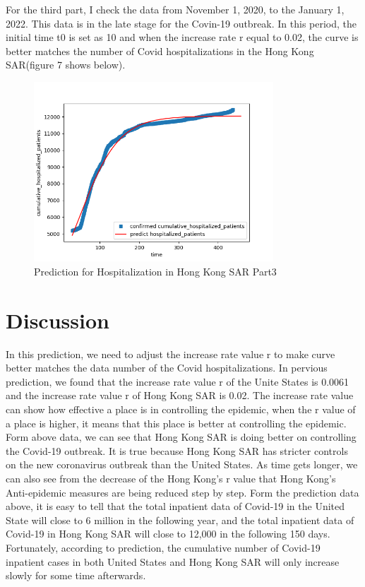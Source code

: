 \documentclass[12pt]{article}
\begin{document}
	For the third part, I check the data from November 1, 2020, to the January 1, 2022. This data is in the late stage for the Covin-19 outbreak. In this period, the initial time t0 is set as 10 and when the increase rate r equal to 0.02, the curve is better matches the number of Covid hospitalizations in the Hong Kong SAR(figure 7 shows below).
	\clearpage
	\begin{figure}[h]
		\centering
		\includegraphics[width=0.8\textwidth]{Figure7.png}
		\caption{Prediction for Hospitalization in Hong Kong SAR Part3}
	\end{figure}
	
	\section{Discussion}
	
	In this prediction, we need to adjust the increase rate value r to make curve better matches the data number of the Covid hospitalizations. In pervious prediction, we found that the increase rate value r of the Unite States is 0.0061 and the increase rate value r of Hong Kong SAR is 0.02. The increase rate value can show how effective a place is in controlling the epidemic, when the r value of a place is higher, it means that this place is better at controlling the epidemic. Form above data, we can see that Hong Kong SAR is doing better on controlling the Covid-19 outbreak. It is true because Hong Kong SAR has stricter controls on the new coronavirus outbreak than the United States. As time gets longer, we can also see from the decrease of the Hong Kong's r value that Hong Kong's Anti-epidemic measures are being reduced step by step.
	Form the prediction data above, it is easy to tell that the total inpatient data of Covid-19 in the United State will close to 6 million in the following year, and the total inpatient data of Covid-19 in Hong Kong SAR will close to 12,000 in the following 150 days. Fortunately, according to prediction, the cumulative number of Covid-19 inpatient cases in both United States and Hong Kong SAR will only increase slowly for some time afterwards.
	\clearpage
\end{document}
